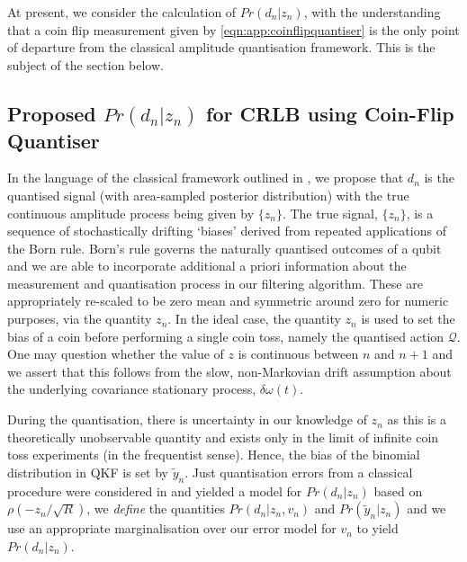 At present, we consider the calculation of $Pr(d_n| z_n)$, with the understanding that  a coin flip measurement given by \cref{eqn:app:coinflipquantiser} is the only point of departure from the classical amplitude quantisation framework. This is the subject of the section below.

\subsection{Proposed $Pr(d_n | z_n)$ for CRLB using Coin-Flip Quantiser}

In the language of the classical framework outlined in \cite{karlsson2005, widrow1996}, we propose that $d_n$ is the quantised signal (with area-sampled posterior distribution) with the true continuous amplitude process being given by $\{z_n \}$. The true signal, $\{z_n\}$, is a sequence of stochastically drifting `biases' derived from repeated applications of the Born rule. Born's rule governs the naturally quantised outcomes of a qubit and we are able to incorporate additional a priori information about the measurement and quantisation process in our filtering algorithm. These are appropriately re-scaled to be zero mean and symmetric around zero for numeric purposes, via the quantity $z_n$. In the ideal case, the quantity $z_n$ is used to set the bias of a coin before performing a single coin toss, namely the quantised action $\mathcal{Q}$.  One may question whether the value of $z$ is continuous between $n$ and $n+1$ and we assert that this follows from the slow, non-Markovian drift assumption about the underlying covariance stationary process, $\delta \omega (t)$.  

During the quantisation, there is uncertainty in our knowledge of $z_n$ as this is a theoretically unobservable quantity and exists only in the limit of infinite coin toss experiments (in the frequentist sense). Hence, the bias  of the binomial distribution in QKF is set by $\tilde{y}_n$. Just quantisation errors  from a classical procedure were considered in \cite{karlsson2005} and yielded a model for $Pr(d_n | z_n)$ based on $\rho(-z_n/ \sqrt{R})$,  we \emph{define} the quantities $Pr(d_n | z_n, v_n)$ and $ Pr( \tilde{y}_n | z_n)$ and we use an appropriate marginalisation over our error model for $v_n$ to yield $Pr(d_n | z_n)$.


